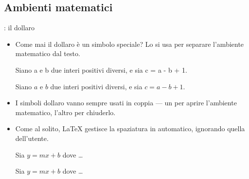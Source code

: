 \documentclass{beamer}
\begin{document}
\subsection{Ambienti matematici}
\begin{frame}[fragile]{\insertsubsection{}: il dollaro}
\begin{itemize}
\item Come mai il dollaro \keystrokebftt{\$} \`e un simbolo speciale?
Lo si usa per separare l'ambiente matematico dal testo.\\[1ex]
\begin{exampletwouptiny}
Siano a e b due interi positivi
diversi, e sia c = a - b + 1.

Siano $a$ e $b$ due interi positivi
diversi, e sia $c = a - b + 1$.
\end{exampletwouptiny}
\item I simboli dollaro vanno sempre usati in coppia --- un per aprire l'ambiente
matematico, l'altro per chiuderlo.
\item Come al solito, \LaTeX{} gestisce la spaziatura in automatico,
ignorando quella dell'utente.
\begin{exampletwouptiny}
Sia $y=mx+b$ dove \ldots

Sia $y = m x + b$ dove \ldots
\end{exampletwouptiny}
\end{itemize}
\end{frame}
\end{document}
